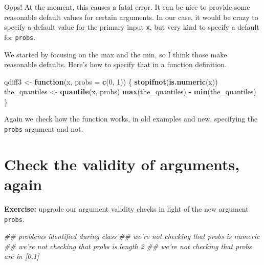 \documentclass[
]{book}
\newenvironment{Shaded}{\begin{snugshade}}{\end{snugshade}}
\newcommand{\CommentTok}[1]{\textcolor[rgb]{0.56,0.35,0.01}{\textit{#1}}}
\newcommand{\ControlFlowTok}[1]{\textcolor[rgb]{0.13,0.29,0.53}{\textbf{#1}}}
\newcommand{\DataTypeTok}[1]{\textcolor[rgb]{0.13,0.29,0.53}{#1}}
\newcommand{\DecValTok}[1]{\textcolor[rgb]{0.00,0.00,0.81}{#1}}
\newcommand{\FloatTok}[1]{\textcolor[rgb]{0.00,0.00,0.81}{#1}}
\newcommand{\KeywordTok}[1]{\textcolor[rgb]{0.13,0.29,0.53}{\textbf{#1}}}
\newcommand{\NormalTok}[1]{#1}
\newcommand{\OperatorTok}[1]{\textcolor[rgb]{0.81,0.36,0.00}{\textbf{#1}}}
\newcommand{\StringTok}[1]{\textcolor[rgb]{0.31,0.60,0.02}{#1}}
\begin{document}
Oops! At the moment, this causes a fatal error. It can be nice to provide some reasonable default values for certain arguments. In our case, it would be crazy to specify a default value for the primary input \texttt{x}, but very kind to specify a default for \texttt{probs}.

We started by focusing on the max and the min, so I think those make reasonable defaults. Here's how to specify that in a function definition.

\begin{Shaded}
\begin{Highlighting}[]
\NormalTok{qdiff3 <-}\StringTok{ }\ControlFlowTok{function}\NormalTok{(x, }\DataTypeTok{probs =} \KeywordTok{c}\NormalTok{(}\DecValTok{0}\NormalTok{, }\DecValTok{1}\NormalTok{)) \{}
  \KeywordTok{stopifnot}\NormalTok{(}\KeywordTok{is.numeric}\NormalTok{(x))}
\NormalTok{  the_quantiles <-}\StringTok{ }\KeywordTok{quantile}\NormalTok{(x, probs)}
  \KeywordTok{max}\NormalTok{(the_quantiles) }\OperatorTok{-}\StringTok{ }\KeywordTok{min}\NormalTok{(the_quantiles)}
\NormalTok{\}}
\end{Highlighting}
\end{Shaded}

Again we check how the function works, in old examples and new, specifying the \texttt{probs} argument and not.

\begin{Shaded}
\end{Shaded}

\hypertarget{check-the-validity-of-arguments-again}{%
\section{Check the validity of arguments, again}\label{check-the-validity-of-arguments-again}}

\textbf{Exercise:} upgrade our argument validity checks in light of the new argument \texttt{probs}.

\begin{Shaded}
\begin{Highlighting}[]
\CommentTok{## problems identified during class}
\CommentTok{## we're not checking that probs is numeric}
\CommentTok{## we're not checking that probs is length 2}
\CommentTok{## we're not checking that probs are in [0,1]}
\end{Highlighting}
\end{Shaded}
\end{document}
